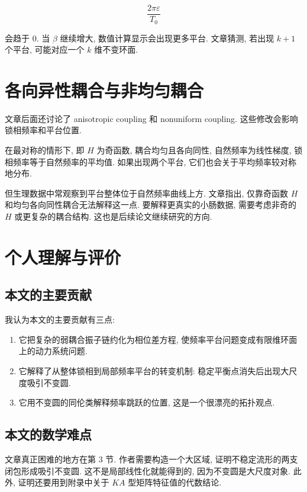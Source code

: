 \documentclass[oneside]{ctexart}
\newcommand{\eps}{\varepsilon}
\begin{document}
\begin{equation}
    \dfrac{2\pi\eps}{T_0}
\end{equation}

会趋于 $0$. 当 $\beta$ 继续增大, 数值计算显示会出现更多平台. 文章猜测, 若出现 $k+1$ 个平台, 可能对应一个 $k$ 维不变环面.

\section{各向异性耦合与非均匀耦合}

文章后面还讨论了 anisotropic coupling 和 nonuniform coupling. 这些修改会影响锁相频率和平台位置.

在最对称的情形下, 即 $H$ 为奇函数, 耦合均匀且各向同性, 自然频率为线性梯度, 锁相频率等于自然频率的平均值. 如果出现两个平台, 它们也会关于平均频率较对称地分布.

但生理数据中常观察到平台整体位于自然频率曲线上方. 文章指出, 仅靠奇函数 $H$ 和均匀各向同性耦合无法解释这一点. 要解释更真实的小肠数据, 需要考虑非奇的 $H$ 或更复杂的耦合结构. 这也是后续论文继续研究的方向.

\section{个人理解与评价}

\subsection{本文的主要贡献}

我认为本文的主要贡献有三点:

\begin{enumerate}[(1)]
    \item 它把复杂的弱耦合振子链约化为相位差方程, 使频率平台问题变成有限维环面上的动力系统问题.
    \item 它解释了从整体锁相到局部频率平台的转变机制: 稳定平衡点消失后出现大尺度吸引不变圆.
    \item 它用不变圆的同伦类解释频率跳跃的位置, 这是一个很漂亮的拓扑观点.
\end{enumerate}

\subsection{本文的数学难点}

文章真正困难的地方在第 3 节. 作者需要构造一个大区域, 证明不稳定流形的两支闭包形成吸引不变圆. 这不是局部线性化就能得到的, 因为不变圆是大尺度对象. 此外, 证明还要用到附录中关于 $KA$ 型矩阵特征值的代数结论.
\end{document}
